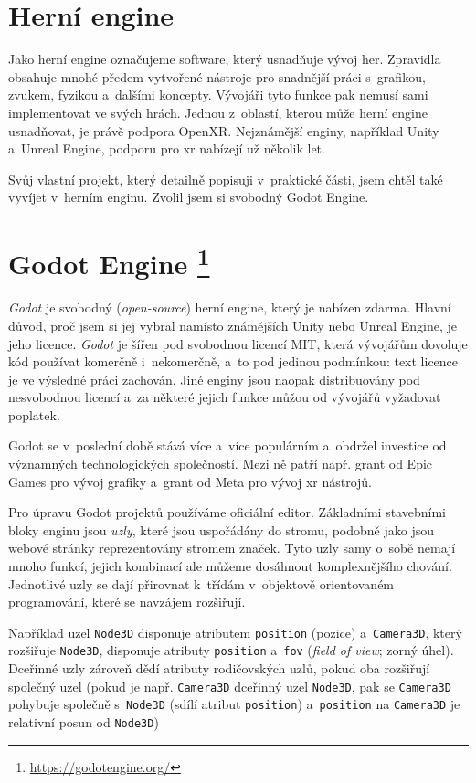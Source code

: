 \section{Herní engine}

Jako herní engine označujeme software, který usnadňuje vývoj her. Zpravidla obsahuje mnohé předem vytvořené nástroje pro snadnější práci s~grafikou, zvukem, fyzikou a~dalšími koncepty. Vývojáři tyto funkce pak nemusí sami implementovat ve svých hrách. Jednou z~oblastí, kterou může herní engine usnadňovat, je právě podpora OpenXR. Nejznámější enginy, například Unity a~Unreal Engine, podporu pro \gls{xr} nabízejí už několik let. \cite{enwiki:1186405367}

Svůj vlastní projekt, který detailně popisuji v~praktické části, jsem chtěl také vyvíjet v~herním enginu. Zvolil jsem si svobodný Godot Engine.

\section[Godot Engine]{Godot Engine \protect\footnote{\url{https://godotengine.org/}}}

\textit{Godot} je svobodný (\textit{open-source}) herní engine, který je nabízen zdarma. Hlavní důvod, proč jsem si jej vybral namísto známějších Unity nebo Unreal Engine, je jeho licence. \textit{Godot} je šířen pod svobodnou licencí MIT, která vývojářům dovoluje kód používat komerčně i~nekomerčně, a~to pod jedinou podmínkou: text licence je ve výsledné práci zachován. Jiné enginy jsou naopak distribuovány pod nesvobodnou licencí a~za některé jejich funkce můžou od vývojářů vyžadovat poplatek.

Godot se v~poslední době stává více a~více populárním a~obdržel investice od významných technologických společností. Mezi ně patří např. grant od Epic Games pro vývoj grafiky a~grant od Meta pro vývoj \gls{xr} nástrojů. \cite{godot_epicgames} \cite{godot_meta}

Pro úpravu Godot projektů používáme oficiální editor. Základními stavebními bloky enginu jsou \textit{uzly}, které jsou uspořádány do stromu, podobně jako jsou webové stránky reprezentovány stromem značek. Tyto uzly samy o~sobě nemají mnoho funkcí, jejich kombinací ale můžeme dosáhnout komplexnějšího chování. Jednotlivé uzly se dají přirovnat k~třídám v~objektově orientovaném programování, které se navzájem rozšiřují.

Například uzel \texttt{Node3D} disponuje atributem \texttt{position} (pozice) a~\texttt{Camera3D}, který rozšiřuje \texttt{Node3D}, disponuje atributy \texttt{position} a~\texttt{fov} (\textit{field of view}; zorný úhel). Dceřinné uzly zároveň dědí atributy rodičovských uzlů, pokud oba rozšiřují společný uzel (pokud je např. \texttt{Camera3D} dceřinný uzel \texttt{Node3D}, pak se \texttt{Camera3D} pohybuje společně s~\texttt{Node3D} (sdílí atribut \texttt{position}) a~\texttt{position} na \texttt{Camera3D} je relativní posun od \texttt{Node3D})


